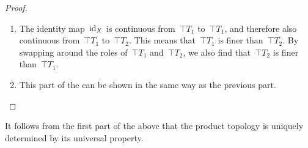 \begin{proof}
	\leavevmode
	\begin{enumerate}

		\item
			The identity map~$\operatorname{id}_X$ is continuous from~$\top{T}_1$ to~$\top{T}_1$, and therefore also continuous from~$\top{T}_1$ to~$\top{T}_2$.
			This means that~$\top{T}_1$ is finer than~$\top{T}_2$.
			By swapping around the roles of~$\top{T}_1$ and~$\top{T}_2$, we also find that~$\top{T}_2$ is finer than~$\top{T}_1$.

		\item
			This part of the  can be shown in the same way as the previous part.
		\qedhere

	\end{enumerate}
\end{proof}

It follows from the first part of the above  that the product topology is uniquely determined by its universal property.
